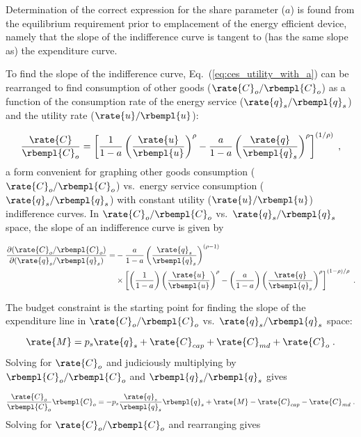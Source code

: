 Determination of the correct expression for the share parameter ($a$) is found from the 
equilibrium requirement prior to emplacement of the energy efficient device,
namely that the slope of the indifference curve is tangent to (has the same slope as)
the expenditure curve.

To find the slope of the indifference curve,
Eq.~(\ref{eq:ces_utility_with_a}) can be rearranged to find 
consumption of other goods ($\rate{C}_o/\rbempl{C}_o$)
as a function of the consumption rate of the energy service 
($\rate{q}_s/\rbempl{q}_s$)
and the utility rate ($\rate{u}/\rbempl{u}$):

\begin{equation}
  \frac{\rate{C}}{\rbempl{C}_o} = 
      \left[ \frac{1}{1 - a} \left( \frac{\rate{u}}{\rbempl{u}} \right)^\rho 
            - \frac{a}{1 - a} \left( \frac{\rate{q}}{\rbempl{q}_s} \right)^\rho \right]^{(1/\rho)} \; ,
\end{equation}
%
a form convenient for graphing other goods consumption ($\rate{C}_o/\rbempl{C}_o$) vs.\ 
energy service consumption ($\rate{q}_s/\rbempl{q}_s$) 
with constant utility ($\rate{u}/\rbempl{u}$) indifference curves.
In $\rate{C}_o/\rbempl{C}_o$ vs.\ $\rate{q}_s/\rbempl{q}_s$ space, 
the slope of an indifference curve is given by 

\begin{align} \label{eq:slope_indifference_curve}
  \frac{\partial (\rate{C}_o/\rbempl{C}_o)}{\partial (\rate{q}_s/\rbempl{q}_s)} =&
        -\frac{a}{1 - a} \left( \frac{\rate{q}_s}{\rbempl{q}_s} \right)^{(\rho -1)} \nonumber  \\
        &\times \left[ \left( \frac{1}{1 - a} \right) \left( \frac{\rate{u}}{\rbempl{u}} \right)^\rho
                - \left( \frac{a}{1 - a} \right) 
                          \left( \frac{\rate{q}}{\rbempl{q}_s} \right)^\rho \right]^{(1 - \rho)/\rho} \; .
\end{align}

The budget constraint is the starting point for finding 
the slope of the expenditure line in 
$\rate{C}_o/\rbempl{C}_o$ vs.\ $\rate{q}_s/\rbempl{q}_s$ space:

\begin{equation}
  \rate{M} = p_s \rate{q}_s + \rate{C}_{cap} + \rate{C}_{md} + \rate{C}_o \; . 
\end{equation}
%
Solving for $\rate{C}_o$ and judiciously multiplying by $\rbempl{C}_o/\rbempl{C}_o$
and $\rbempl{q}_s/\rbempl{q}_s$ gives

\begin{equation}
  \frac{\rate{C}_o}{\rbempl{C}_o} \rbempl{C}_o = - p_s \frac{\rate{q}_s}{\rbempl{q}_s} \rbempl{q}_s
                        + \rate{M} - \rate{C}_{cap} - \rate{C}_{md} \; .
\end{equation}
%
Solving for $\rate{C}_o/\rbempl{C}_o$ and rearranging gives

